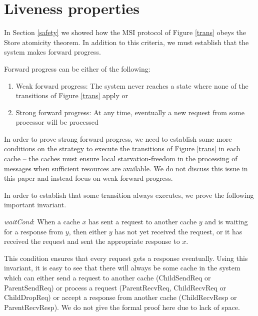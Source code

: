\section{Liveness properties}
\label{liveness}

In Section \ref{safety} we showed how the MSI protocol of Figure \ref{trans}
obeys the Store atomicity theorem. In addition to this criteria, we must
establish that the system makes forward progress.

Forward progress can be either of the following:
\begin{enumerate}
\item Weak forward progress: The system never reaches a state where none of the transitions of Figure
\ref{trans} apply or
\item Strong forward progress: At any time, eventually a new request from some processor will be
processed
\end{enumerate}

In order to prove strong forward progress, we need to
establish some more conditions on the strategy to execute the transitions of
Figure \ref{trans} in each cache -- the caches must ensure local
starvation-freedom in the processing of messages when sufficient resources are
available. We do not discuss this issue in this paper and instead focus on 
weak forward progress.

In order to establish that some transition always executes, we prove the
following important invariant.

\begin{inv}
\textit{waitCond}: When a cache $x$ has sent a request to another cache $y$ and
is waiting for a response from $y$, then either $y$ has not yet received the
request, or it has received the request and sent the appropriate response to
$x$.
\end{inv}

This condition ensures that every request gets a response eventually. Using
this invariant, it is easy to see that there will always be some cache in the
system which can either send a request to another cache (ChildSendReq or
ParentSendReq) or process a request (ParentRecvReq, ChildRecvReq or
ChildDropReq) or accept a response from another cache (ChildRecvResp or
ParentRecvResp). We do not give the formal proof here due to lack of space.
